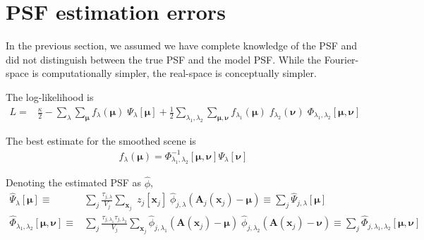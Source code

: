 \documentclass[DM,authoryear,toc]{lsstdoc}
\begin{document}
\section{PSF estimation errors}

In the previous section, we assumed we have complete knowledge of the PSF and did not distinguish between the true PSF and the model PSF. While the Fourier-space is computationally simpler, the real-space is conceptually simpler.

The log-likelihood is
\begin{align}
    L =&
        \frac{\kappa}{2}
    -
        \sum_{\lambda}
        \sum_{\bm{\mu}}
        f_{\lambda}(\bm{\mu})
        \;\Psi_{\lambda}[\bm{\mu}]
    +
        \frac{1}{2}
        \sum_{\lambda_1,\lambda_2}
        \sum_{\bm{\mu},\bm{\nu}}
        f_{\lambda_1}(\bm{\mu}) \;
        f_{\lambda_2}(\bm{\nu}) \;
        \Phi_{\lambda_1,\lambda_2}[\bm{\mu},\bm{\nu}]
    \end{align}
    
    The best estimate for the smoothed scene is
    \begin{align}
        f_{\lambda}(\bm{\mu}) = {\Phi_{\lambda_1,\lambda_2}^{-1}[\bm{\mu}, \bm{\nu}]} \Psi_{\lambda}[\bm{\nu}]
    \end{align}

Denoting the estimated PSF as $\hat{\phi}$, 
\begin{align}
    \hat{\Psi}_{\lambda}[\bm{\mu}] \equiv &
        \sum_{j}
        \frac{\tau_{j,\lambda}}{V_j}
        \sum_{\bm{x}_j}
            \; z_j[\bm{x}_j]
            \; \hat{\phi}_{j,\lambda}\!\left(
                \bm{A}_j(\bm{x}_j) - \bm{\mu}
            \right)
        \equiv \sum_{j} \hat{\Psi}_{j,\lambda}[\bm{\mu}]
    \label{eqn:psihat-accumulated}
    \\
    \hat{\Phi}_{\lambda_1,\lambda_2}[\bm{\mu},\bm{\nu}] \equiv &
        \sum_{j}
        \frac{
            \tau_{j,\lambda_1}
            \tau_{j,\lambda_2}
        }{
            V_j
        }
        \sum_{\bm{x}_j}
            \hat{\phi}_{j,\lambda_1}\!\left(
                \bm{A}(\bm{x}_j) - \bm{\mu}
            \right)
            \; \hat{\phi}_{j,\lambda_2}\!\left(
                \bm{A}(\bm{x}_j) - \bm{\nu}
            \right)
    \equiv \sum_{j} \hat{\Phi}_{j,\lambda_1,\lambda_2}[\bm{\mu},\bm{\nu}]
    \label{eqn:phihat-accumulated}
\end{align}
\end{document}
